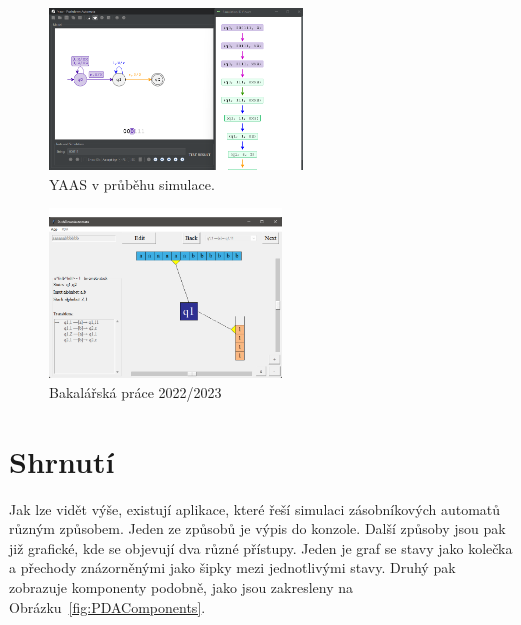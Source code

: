 \begin{figure}[h]
    \centering
    \includegraphics[width=0.6\textwidth]{Figures/PrntScrn_YAAS.png}
    \caption{YAAS v průběhu simulace.}\label{fig:YAAS}
\end{figure}

\begin{figure}[h]
    \centering
    \includegraphics[width=0.55\textwidth]{Figures/PrntScrn_BP.png}
    \caption{Bakalářská práce 2022/2023}\label{fig:BP}
\end{figure}

\section{Shrnutí}

Jak lze vidět výše, existují aplikace, které řeší simulaci zásobníkových automatů různým způsobem. Jeden ze způsobů je výpis do konzole. Další způsoby jsou pak již grafické, kde se objevují dva různé přístupy. Jeden je graf se stavy jako kolečka a přechody znázorněnými jako šipky mezi jednotlivými stavy. Druhý pak zobrazuje komponenty podobně, jako jsou zakresleny na Obrázku~\ref{fig:PDAComponents}.

\endinput